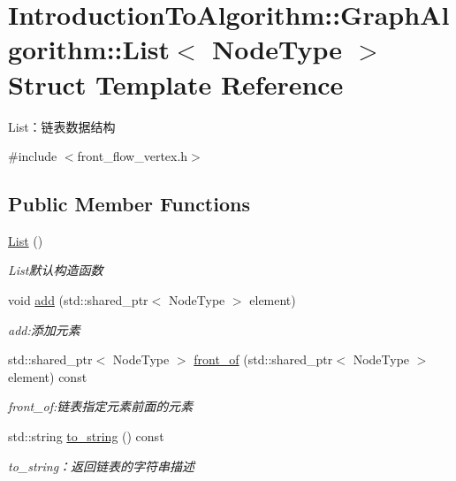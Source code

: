 \hypertarget{struct_introduction_to_algorithm_1_1_graph_algorithm_1_1_list}{}\section{Introduction\+To\+Algorithm\+:\+:Graph\+Algorithm\+:\+:List$<$ Node\+Type $>$ Struct Template Reference}
\label{struct_introduction_to_algorithm_1_1_graph_algorithm_1_1_list}


List：链表数据结构  




{\ttfamily \#include $<$front\+\_\+flow\+\_\+vertex.\+h$>$}

\subsection*{Public Member Functions}
\begin{DoxyCompactItemize}
\item 
\hyperlink{struct_introduction_to_algorithm_1_1_graph_algorithm_1_1_list_a286b76ddec66a739312a2f5cef3ae544}{List} ()
\begin{DoxyCompactList}\small\item\em List默认构造函数 \end{DoxyCompactList}\item 
void \hyperlink{struct_introduction_to_algorithm_1_1_graph_algorithm_1_1_list_a03267a13e44d42586d44460d04138cc1}{add} (std\+::shared\+\_\+ptr$<$ Node\+Type $>$ element)
\begin{DoxyCompactList}\small\item\em add\+:添加元素 \end{DoxyCompactList}\item 
std\+::shared\+\_\+ptr$<$ Node\+Type $>$ \hyperlink{struct_introduction_to_algorithm_1_1_graph_algorithm_1_1_list_abd886aeac60fbdfa0290cafd7d67b718}{front\+\_\+of} (std\+::shared\+\_\+ptr$<$ Node\+Type $>$ element) const 
\begin{DoxyCompactList}\small\item\em front\+\_\+of\+:链表指定元素前面的元素 \end{DoxyCompactList}\item 
std\+::string \hyperlink{struct_introduction_to_algorithm_1_1_graph_algorithm_1_1_list_a7a75e61d7a61923e5b185e1b4781d29f}{to\+\_\+string} () const 
\begin{DoxyCompactList}\small\item\em to\+\_\+string：返回链表的字符串描述 \end{DoxyCompactList}\end{DoxyCompactItemize}
